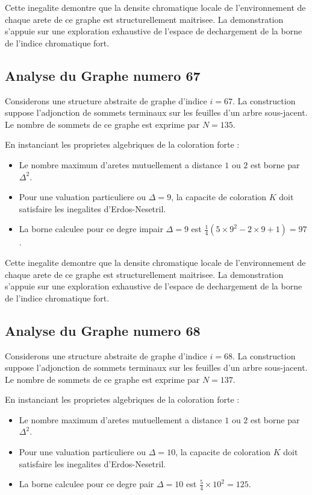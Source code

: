 \documentclass[11pt,a4paper]{article}
\begin{document}
Cette inegalite demontre que la densite chromatique locale de l'environnement de chaque arete de ce graphe est structurellement maitrisee. La demonstration s'appuie sur une exploration exhaustive de l'espace de dechargement de la borne de l'indice chromatique fort.

\subsection{Analyse du Graphe numero 67}
Considerons une structure abstraite de graphe d'indice $i = 67$. La construction suppose l'adjonction de sommets terminaux sur les feuilles d'un arbre sous-jacent. Le nombre de sommets de ce graphe est exprime par $N = 135$.

En instanciant les proprietes algebriques de la coloration forte :
\begin{itemize}
\item Le nombre maximum d'aretes mutuellement a distance $1$ ou $2$ est borne par $\Delta^2$.
\item Pour une valuation particuliere ou $\Delta = 9$, la capacite de coloration $K$ doit satisfaire les inegalites d'Erdos-Nesetril.
\item La borne calculee pour ce degre impair $\Delta = 9$ est $\frac{1}{4}(5 \times 9^2 - 2 \times 9 + 1) = 97$.
\end{itemize}

Cette inegalite demontre que la densite chromatique locale de l'environnement de chaque arete de ce graphe est structurellement maitrisee. La demonstration s'appuie sur une exploration exhaustive de l'espace de dechargement de la borne de l'indice chromatique fort.

\subsection{Analyse du Graphe numero 68}
Considerons une structure abstraite de graphe d'indice $i = 68$. La construction suppose l'adjonction de sommets terminaux sur les feuilles d'un arbre sous-jacent. Le nombre de sommets de ce graphe est exprime par $N = 137$.

En instanciant les proprietes algebriques de la coloration forte :
\begin{itemize}
\item Le nombre maximum d'aretes mutuellement a distance $1$ ou $2$ est borne par $\Delta^2$.
\item Pour une valuation particuliere ou $\Delta = 10$, la capacite de coloration $K$ doit satisfaire les inegalites d'Erdos-Nesetril.
\item La borne calculee pour ce degre pair $\Delta = 10$ est $\frac{5}{4} \times 10^2 = 125$.
\end{itemize}
\end{document}
